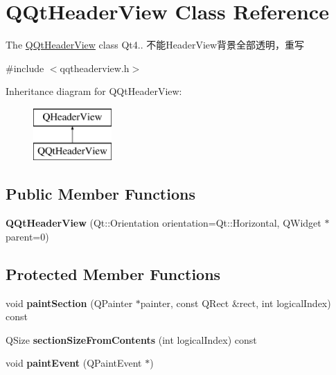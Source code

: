 \hypertarget{class_q_qt_header_view}{}\section{Q\+Qt\+Header\+View Class Reference}
\label{class_q_qt_header_view}


The \mbox{\hyperlink{class_q_qt_header_view}{Q\+Qt\+Header\+View}} class Qt4.. 不能\+Header\+View背景全部透明，重写  




{\ttfamily \#include $<$qqtheaderview.\+h$>$}

Inheritance diagram for Q\+Qt\+Header\+View\+:\begin{figure}[H]
\begin{center}
\leavevmode
\includegraphics[height=2.000000cm]{class_q_qt_header_view}
\end{center}
\end{figure}
\subsection*{Public Member Functions}
\begin{DoxyCompactItemize}
\item 
\mbox{\label{class_q_qt_header_view_a5d34777c43a55502b3d0d30f252af66f}} 
{\bfseries Q\+Qt\+Header\+View} (Qt\+::\+Orientation orientation=Qt\+::\+Horizontal, Q\+Widget $\ast$parent=0)
\end{DoxyCompactItemize}
\subsection*{Protected Member Functions}
\begin{DoxyCompactItemize}
\item 
\mbox{\label{class_q_qt_header_view_ad3dd7c31c00efcfe87e28e942207cc64}} 
void {\bfseries paint\+Section} (Q\+Painter $\ast$painter, const Q\+Rect \&rect, int logical\+Index) const
\item 
\mbox{\label{class_q_qt_header_view_abeedec955b833678952f5417f5a44f8d}} 
Q\+Size {\bfseries section\+Size\+From\+Contents} (int logical\+Index) const
\item 
\mbox{\label{class_q_qt_header_view_a591ead09c6cbc3f894512fa8c2718ea1}} 
void {\bfseries paint\+Event} (Q\+Paint\+Event $\ast$)
\end{DoxyCompactItemize}


